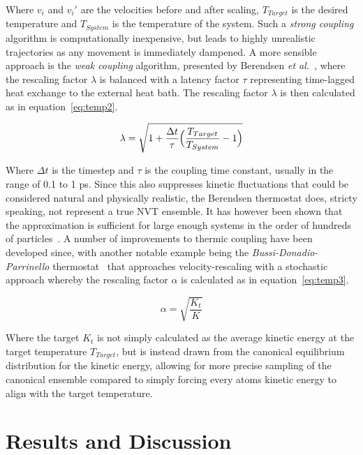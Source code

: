 \documentclass[11pt]{article}
\begin{document}
\bigskip

\noindent Where $v_i$ and $v_i'$ are the velocities before and after scaling, $T_{Target}$ is the desired temperature and $T_{System}$ is the temperature of the system. Such a \textit{strong coupling} algorithm is computationally inexpensive, but leads to highly unrealistic trajectories as any movement is immediately dampened. A more sensible approach is the \textit{weak coupling} algorithm, presented by Berendsen \textit{et al.}~\cite{Berendsen1984}, where the rescaling factor $\lambda$ is balanced with a latency factor $\tau$ representing time-lagged heat exchange to the external heat bath. The rescaling factor $\lambda$ is then calculated as in equation~\ref{eq:temp2}.

\begin{equation}
  \lambda = \sqrt{1 + \frac{\Delta t}{\tau}\Bigl(\frac{T_{Target}}{T_{System}} - 1\Bigr)}
  \label{eq:temp2}
\end{equation}

\bigskip

\noindent Where $\Delta t$ is the timestep and $\tau$ is the coupling time constant, usually in the range of 0.1 to 1 ps. Since this also suppresses kinetic fluctuations that could be considered natural and physically realistic, the Berendsen thermostat does, stricty speaking, not represent a true NVT ensemble. It has however been shown that the approximation is sufficient for large enough systems in the order of hundreds of particles~\cite{Morishita2000}. A number of improvements to thermic coupling have been developed since, with another notable example being the \textit{Bussi-Donadio-Parrinello} thermostat~\cite{Bussi2007} that approaches velocity-rescaling with a stochastic approach whereby the rescaling factor $\alpha$ is calculated as in equation~\ref{eq:temp3}.

\begin{equation}
  \alpha = \sqrt{\frac{K_t}{K}}
  \label{eq:temp3}
\end{equation}

\bigskip

\noindent Where the target $K_t$ is not simply calculated as the average kinetic energy at the target temperature $T_{Target}$, but is instead drawn from the canonical equilibrium distribution for the kinetic energy, allowing for more precise sampling of the canonical ensemble compared to simply forcing every atoms kinetic energy to align with the target temperature.

\section{Results and Discussion}
\end{document}
